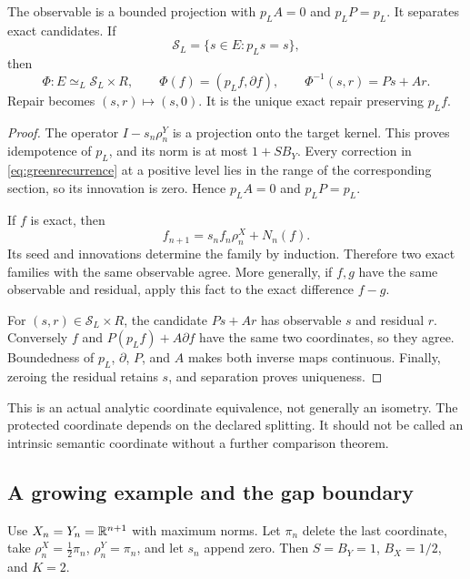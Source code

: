 \begin{theorem}\label{KS21}
The observable is a bounded projection with \(p_LA=0\) and \(p_LP=p_L\). It separates exact candidates. If
\[
 \mathcal S_L=\{s\in E:p_Ls=s\},
\]
then
\[
 \Phi:E\simeq_L\mathcal S_L\times R,
 \qquad \Phi(f)=(p_Lf,\partial f),
 \qquad \Phi^{-1}(s,r)=Ps+Ar.
\]
Repair becomes \((s,r)\mapsto(s,0)\). It is the unique exact repair preserving \(p_Lf\).
\end{theorem}
\begin{proof}
The operator \(I-s_n\rho^Y_n\) is a projection onto the target kernel. This proves idempotence of \(p_L\), and its norm is at most \(1+SB_Y\). Every correction in \eqref{eq:greenrecurrence} at a positive level lies in the range of the corresponding section, so its innovation is zero. Hence \(p_LA=0\) and \(p_LP=p_L\).

If \(f\) is exact, then
\[
 f_{n+1}=s_nf_n\rho^X_n+N_n(f).
\]
Its seed and innovations determine the family by induction. Therefore two exact families with the same observable agree. More generally, if \(f,g\) have the same observable and residual, apply this fact to the exact difference \(f-g\).

For \((s,r)\in\mathcal S_L\times R\), the candidate \(Ps+Ar\) has observable \(s\) and residual \(r\). Conversely \(f\) and \(P(p_Lf)+A\partial f\) have the same two coordinates, so they agree. Boundedness of \(p_L\), \(\partial\), \(P\), and \(A\) makes both inverse maps continuous. Finally, zeroing the residual retains \(s\), and separation proves uniqueness.
\end{proof}
This is an actual analytic coordinate equivalence, not generally an isometry. The protected coordinate depends on the declared splitting. It should not be called an intrinsic semantic coordinate without a further comparison theorem.


\subsection{A growing example and the gap boundary}
Use \(X_n=Y_n=\mathbb R^{n+1}\) with maximum norms. Let \(\pi_n\) delete the last coordinate, take \(\rho^X_n=\tfrac12\pi_n\), \(\rho^Y_n=\pi_n\), and let \(s_n\) append zero. Then \(S=B_Y=1\), \(B_X=1/2\), and \(K=2\).

